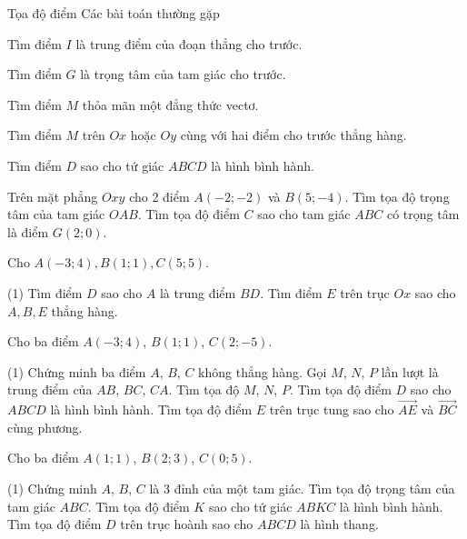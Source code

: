\begin{dang}{Tọa độ điểm}
	Các bài toán thường gặp
	\begin{listEX}[1]
		\item [\ding{172}] Tìm điểm $I$ là trung điểm của đoạn thẳng cho trước.
		\item [\ding{173}] Tìm điểm $G$ là trọng tâm của tam giác cho trước.
		\item [\ding{174}] Tìm điểm $M$ thỏa mãn một đẳng thức vectơ.
		\item [\ding{175}] Tìm điểm $M$ trên $Ox$ hoặc $Oy$ cùng với hai điểm cho trước thẳng hàng.
		\item [\ding{176}] Tìm điểm $D$ sao cho tứ giác $ABCD$ là hình bình hành.
	\end{listEX}
\end{dang}
\begin{vd}
	Trên mặt phẳng $Oxy$ cho 2 điểm $A\left( -2;-2 \right)$ và $B\left( 5;-4 \right)$.
	Tìm tọa độ trọng tâm của tam giác $OAB$.
	Tìm tọa độ điểm $C$ sao cho tam giác $ABC$ có trọng tâm là điểm $G\left( 2;0 \right)$.
\end{vd}

\begin{vd}
	Cho $A\left( -3;4 \right),B\left( 1;1 \right),C\left( 5;5 \right)$.
	\begin{tasks}(1)
		\task Tìm điểm $D$ sao cho $A$ là trung điểm $BD$.
		\task Tìm điểm $E$ trên trục $Ox$ sao cho $A,B,E$ thẳng hàng.
	\end{tasks}
\end{vd}

\begin{vd}
	Cho ba điểm $A(-3;4)$, $B(1;1)$, $C(2;-5)$.
	\begin{tasks}(1)
		\task Chứng minh ba điểm $A$, $B$, $C$ không thẳng hàng.
		\task Gọi $M$, $N$, $P$ lần lượt là trung điểm của $AB$, $BC$, $CA$. Tìm tọa độ $M$, $N$, $P$.
		\task Tìm tọa độ điểm $D$ sao cho $ABCD$ là hình bình hành.
		\task Tìm tọa độ điểm $E$ trên trục tung sao cho $\overrightarrow{AE}$ và $\overrightarrow{BC}$ cùng phương.
	\end{tasks}
\end{vd}

\begin{vd}
	Cho ba điểm $A(1;1)$, $B(2;3)$, $ C(0;5)$.
	\begin{tasks}(1)
		\task Chứng minh $A$, $B$, $C$ là 3 đỉnh của một tam giác. Tìm tọa độ trọng tâm của tam giác $ABC$. 
		\task Tìm tọa độ điểm $K$ sao cho tứ giác $ABKC$ là hình bình hành.
		\task Tìm tọa độ điểm $D$ trên trục hoành sao cho $ABCD$ là hình thang.
	\end{tasks}
\end{vd}

